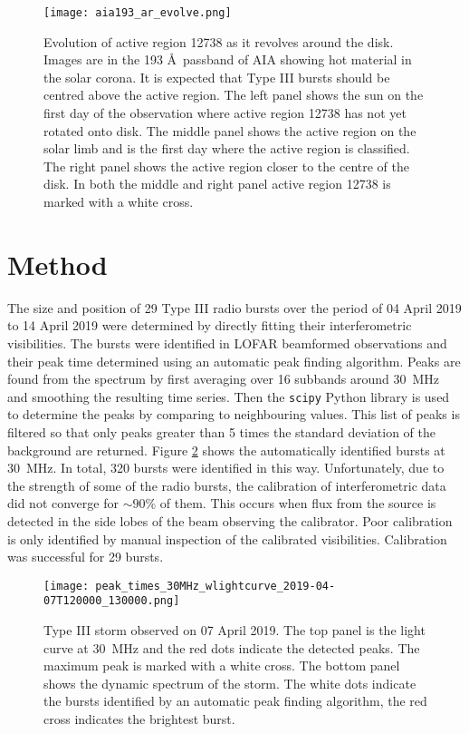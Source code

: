\begin{figure}[ht]
\centering
\texttt{[image: aia193\_ar\_evolve.png]}
\caption[Evolution of active region 12738 as it revolves around the disk.]{Evolution of active region 12738 as it revolves around the disk. Images are in the 193 \AA \ passband of AIA showing hot material in the solar corona. It is expected that Type III bursts should be centred above the active region. The left panel shows the sun on the first day of the observation where active region 12738 has not yet rotated onto disk. The middle panel shows the active region on the solar limb and is the first day where the active region is classified. The right panel shows the active region closer to the centre of the disk. In both the middle and right panel active region 12738 is marked with a white cross.}
\label{fig:ar_evolve}
\end{figure}

\section{Method}
\label{sec:obsvtheory_method}
The size and position of 29 Type III radio bursts over the period of 04 April 2019 to 14 April 2019 were determined by directly fitting their interferometric visibilities. The bursts were identified in LOFAR beamformed observations and their peak time determined using an automatic peak finding algorithm. Peaks are found from the spectrum by first averaging over 16 subbands around 30~MHz and smoothing the resulting time series. Then the \texttt{scipy} Python library \citep{Virtanen2020} is used to determine the peaks by comparing to neighbouring values. This list of peaks is filtered so that only peaks greater than 5 times the standard deviation of the background are returned.
Figure \ref{fig:dynamic_spectrum_070419} shows the automatically identified bursts at 30~MHz. In total, 320 bursts were identified in this way. Unfortunately, due to the strength of some of the radio bursts, the calibration of interferometric data did not converge for $\sim 90 \%$ of them. This occurs when flux from the source is detected in the side lobes of the beam observing the calibrator. Poor calibration is only identified by manual inspection of the calibrated visibilities. Calibration was successful for 29 bursts.  

\begin{figure}[ht]
\centering
\texttt{[image: peak\_times\_30MHz\_wlightcurve\_2019-04-07T120000\_130000.png]}
\caption[Type III storm observed on 07 April 2019.]{Type III storm observed on 07 April 2019. The top panel is the light curve at 30~MHz and the red dots indicate the detected peaks. The maximum peak is marked with a white cross. The bottom panel shows the dynamic spectrum of the storm. The white dots indicate the bursts identified by an automatic peak finding algorithm, the red cross indicates the brightest burst.}
\label{fig:dynamic_spectrum_070419}
\end{figure}

